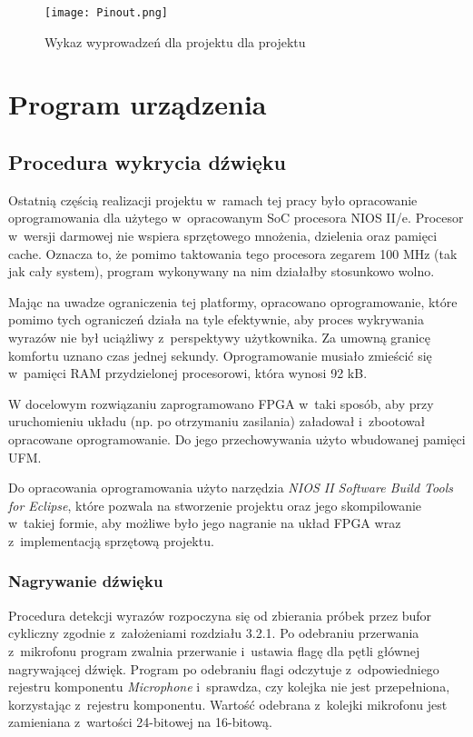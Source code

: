 \begin{figure}[h]
	\centering
	\texttt{[image: Pinout.png]}
	\caption{Wykaz wyprowadzeń dla projektu dla projektu}
\end{figure}
\FloatBarrier %


\newpage
\section{Program urządzenia}
\subsection{Procedura wykrycia dźwięku}

Ostatnią częścią realizacji projektu w~ramach tej pracy było opracowanie oprogramowania dla użytego w~opracowanym SoC procesora NIOS II/e. Procesor w~wersji darmowej nie wspiera sprzętowego mnożenia, dzielenia oraz pamięci cache. Oznacza to, że pomimo taktowania tego procesora zegarem 100 MHz (tak jak cały system), program wykonywany na nim działałby stosunkowo wolno.

Mając na uwadze ograniczenia tej platformy, opracowano oprogramowanie, które pomimo tych ograniczeń działa na tyle efektywnie, aby proces wykrywania wyrazów nie był uciążliwy z~perspektywy użytkownika. Za umowną granicę komfortu uznano czas jednej sekundy. Oprogramowanie musiało zmieścić się w~pamięci RAM przydzielonej procesorowi, która wynosi 92 kB.

W docelowym rozwiązaniu zaprogramowano FPGA w~taki sposób, aby przy uruchomieniu układu (np. po otrzymaniu zasilania) załadował i~zbootował opracowane oprogramowanie. Do jego przechowywania użyto wbudowanej pamięci UFM.

Do opracowania oprogramowania użyto narzędzia \textit{NIOS II Software Build Tools for Eclipse}, które pozwala na stworzenie projektu oraz jego skompilowanie w~takiej formie, aby możliwe było jego nagranie na układ FPGA wraz z~implementacją sprzętową projektu.

\subsubsection{Nagrywanie dźwięku}

Procedura detekcji wyrazów rozpoczyna się od zbierania próbek przez bufor cykliczny zgodnie z~założeniami rozdziału 3.2.1. Po odebraniu przerwania z~mikrofonu program zwalnia przerwanie i~ustawia flagę dla pętli głównej nagrywającej dźwięk. Program po odebraniu flagi odczytuje z~odpowiedniego rejestru komponentu \textit{Microphone} i~sprawdza, czy kolejka nie jest przepełniona, korzystając z~rejestru komponentu. Wartość odebrana z~kolejki mikrofonu jest zamieniana z~wartości 24-bitowej na 16-bitową.


